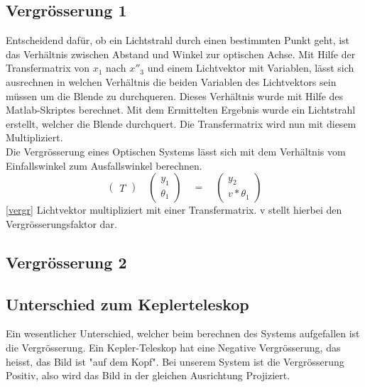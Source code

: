 \documentclass[11pt,twoside,a4paper]{article}
\begin{document}
	\subsection{Vergrösserung 1}
	Entscheidend dafür, ob ein Lichtstrahl durch einen bestimmten Punkt geht, ist das Verhältnis zwischen Abstand und Winkel zur optischen Achse. Mit Hilfe der Transfermatrix von \(x_{1}\) nach \(x''_{3}\) und einem Lichtvektor mit Variablen, lässt sich ausrechnen in welchen Verhältnis die beiden Variablen des Lichtvektors sein müssen um die Blende zu durchqueren. Dieses Verhältnis wurde mit Hilfe des Matlab-Skriptes berechnet. Mit dem Ermittelten Ergebnis wurde ein Lichtstrahl erstellt, welcher die Blende durchquert. Die Transfermatrix wird nun mit diesem Multipliziert. \\
	Die Vergrösserung eines Optischen Systems lässt sich mit dem Verhältnis vom Einfallswinkel zum Ausfallswinkel berechnen. 
	\begin{equation} \label{vergr}
	\begin{pmatrix}
	T
	\end{pmatrix}
	\quad
	\begin{pmatrix}
	y_{1}\\
	\theta_{1}
	\end{pmatrix}
	\quad
	=
	\quad
	\begin{pmatrix}
	y_{2}\\
	v * \theta_{1}
	\end{pmatrix}
	\end{equation}
	\ref{vergr} Lichtvektor multipliziert mit einer Transfermatrix. v stellt hierbei den Vergrösserungsfaktor dar. 
	\subsection{Vergrösserung 2}
	\subsection{Unterschied zum Keplerteleskop}
	Ein wesentlicher Unterschied, welcher beim berechnen des Systems aufgefallen ist die Vergrösserung. Ein Kepler-Teleskop hat eine Negative Vergrösserung, das heisst, das Bild ist "auf dem Kopf". Bei unserem System ist die Vergrösserung Positiv, also wird das Bild in der gleichen Ausrichtung Projiziert. 
\end{document}
